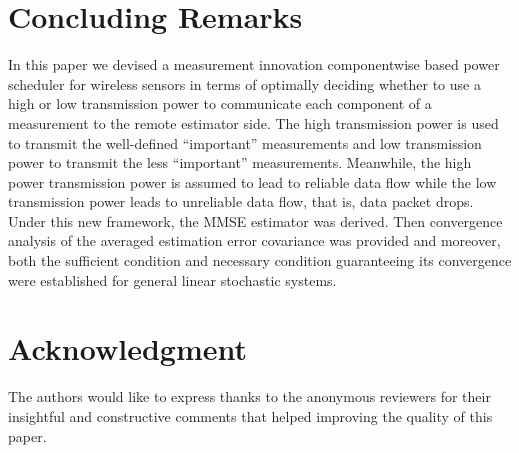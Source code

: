 \documentclass[journal]{IEEEtran}
\begin{document}
\section{Concluding Remarks}
\label{section 4}
In this paper we devised a measurement innovation componentwise based power scheduler for wireless sensors in terms of optimally deciding whether to use a high or low transmission power to communicate each component of a measurement to the remote estimator side. The high transmission power is used to transmit the well-defined ``important'' measurements and low transmission power to transmit the less ``important'' measurements. Meanwhile, the high power transmission power is assumed to lead to reliable data flow while the low transmission power leads to unreliable data flow, that is, data packet drops. Under this new framework, the MMSE estimator was derived. Then convergence analysis of the averaged estimation error covariance was provided and moreover, both the sufficient condition and necessary condition guaranteeing its convergence were established for general linear stochastic systems. {}




\section*{Acknowledgment}
The authors would like to express thanks to the anonymous reviewers for their insightful and constructive comments
that helped improving the quality of this paper.
\end{document}
